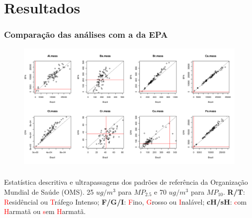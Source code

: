 \section{Resultados}

\begin{frame}
  \frametitle{Comparação das análises com a da EPA}
  \begin{figure}[H]
   \centering
    \includegraphics[scale=0.30]{../../../inputs/images/zheng/epa_page1_example.PDF}
  \end{figure}
\end{frame}

\begin{frame}
  \frametitle{}
  \begin{table}
    
    \caption{Estatística descritiva e ultrapassagens dos padrões de referência 
             da Organização Mundial de Saúde (OMS). 
            25 $ug/m^3$ para $MP_{2.5}$ e 70 $ug/m^3$ para $MP_{10}$.
           \textbf{R/T}: \textcolor{red}{R}esidêncial ou \textcolor{red}{T}ráfego Intenso; 
           \textbf{F/G/I}: \textcolor{red}{F}ino, \textcolor{red}{G}rosso ou \textcolor{red}{I}nalável; 
           \textbf{cH/sH}: \textcolor{red}{c}om \textcolor{red}{H}armatã ou \textcolor{red}{s}em \textcolor{red}{H}armatã.}
  \end{table}

\end{frame}

\begin{frame}
  \frametitle{}
    
\end{frame}

\begin{frame}
  \frametitle{}
    
\end{frame}

